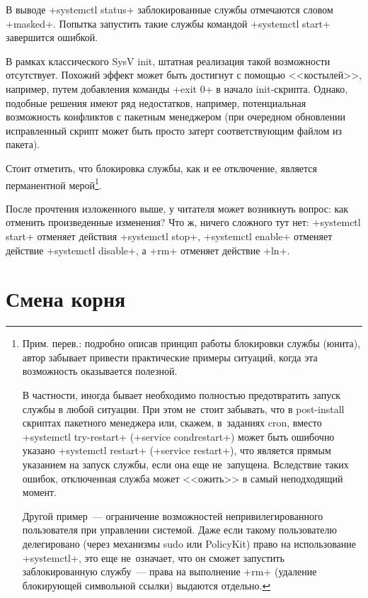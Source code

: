 \documentclass[10pt,oneside,a4paper]{article}
\begin{document}
\begin{itemize}
		В выводе +systemctl status+ заблокированные службы отмечаются
		словом +masked+. Попытка запустить такие службы командой
		+systemctl start+ завершится ошибкой.

		В рамках классического SysV init, штатная реализация такой
		возможности отсутствует. Похожий эффект может быть
		достигнут с помощью <<костылей>>, например, путем добавления
		команды +exit 0+ в начало init-скрипта. Однако, подобные решения
		имеют ряд недостатков, например, потенциальная возможность
		конфликтов с пакетным менеджером (при очередном обновлении
		исправленный скрипт может быть просто затерт соответствующим
		файлом из пакета).

		Стоит отметить, что блокировка службы, как и ее отключение,
		является перманентной мерой\footnote{Прим. перев.: подробно
		описав принцип работы блокировки службы (юнита), автор забывает
		привести практические примеры ситуаций, когда эта возможность
		оказывается полезной.
		
		В частности, иногда бывает необходимо
		полностью предотвратить запуск службы в любой ситуации. При этом
		не~стоит забывать, что в post-install скриптах пакетного
		менеджера или, скажем, в~заданиях cron, вместо
		+systemctl try-restart+ (+service condrestart+) может быть
		ошибочно указано +systemctl restart+ (+service restart+), что
		является прямым указанием на запуск службы, если она еще
		не~запущена. Вследствие таких ошибок, отключенная служба может
		<<ожить>> в самый неподходящий момент.
		
		Другой пример~---
		ограничение возможностей непривилегированного пользователя при
		управлении системой. Даже если такому пользователю делегировано
		(через механизмы sudo или PolicyKit) право на использование
		+systemctl+, это еще не~означает, что он сможет запустить
		заблокированную службу~--- права на выполнение +rm+ (удаление
		блокирующей символьной ссылки) выдаются отдельно.}.
\end{itemize}

После прочтения изложенного выше, у читателя может возникнуть вопрос: как
отменить произведенные изменения? Что ж, ничего сложного тут нет:
+systemctl start+ отменяет действия +systemctl stop+, +systemctl enable+
отменяет действие +systemctl disable+, а +rm+ отменяет действие +ln+.

\section{Смена корня}
\end{document}
